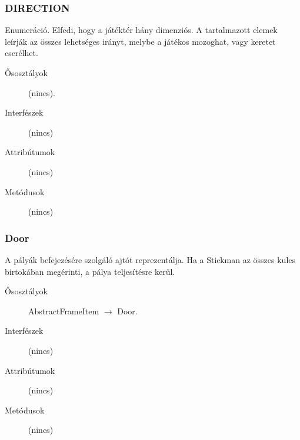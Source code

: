 		\subsubsection{DIRECTION}
				 Enumeráció. Elfedi, hogy a játéktér hány dimenziós.  A tartalmazott elemek leírják az összes lehetséges irányt,   melybe a játékos mozoghat, vagy keretet cserélhet.  			\begin{description}


				\item[Ősosztályok] (nincs).
				\item[Interfészek] (nincs)
				\item[Attribútumok] (nincs)
				\item[Metódusok] (nincs)
			\end{description}

		\subsubsection{Door}
				 A pályák befejezésére szolgáló ajtót reprezentálja.  Ha a Stickman az összes kulcs birtokában megérinti,  a pálya teljesítésre kerül. 			\begin{description}


				\item[Ősosztályok] AbstractFrameItem $\rightarrow{}$ Door.
				\item[Interfészek] (nincs)
				\item[Attribútumok] (nincs)
				\item[Metódusok] (nincs)
			\end{description}

